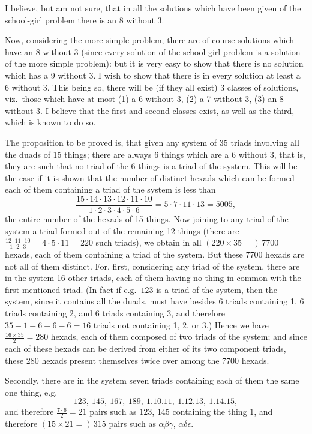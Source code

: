 \documentclass[11pt,a4paper]{article}
\theoremstyle{plain}
\begin{document}
I believe, but am not sure, that in all the solutions which have been given of the school-girl problem there is an 8 without 3.

Now, considering the more simple problem, there are of course solutions which have an 8 without 3 (since every solution of the school-girl problem is a solution of the more simple problem): but it is very easy to show that there is no solution which has a 9 without 3. I wish to show that there is in every solution at least a 6 without 3. This being so, there will be (if they all exist) 3 classes of solutions, viz.\ those which have at most (1) a 6 without 3, (2) a 7 without 3, (3) an 8 without 3. I believe that the first and second classes exist, as well as the third, which is known to do so.

The proposition to be proved is, that given any system of 35 triads involving all the duads of 15 things; there are always 6 things which are a 6 without 3, that is, they are such that no triad of the 6 things is a triad of the system. This will be the case if it is shown that the number of distinct hexads which can be formed each of them containing a triad of the system is less than
\[
\frac{15 \cdot 14 \cdot 13 \cdot 12 \cdot 11 \cdot 10}{1 \cdot 2 \cdot 3 \cdot 4 \cdot 5 \cdot 6} = 5 \cdot 7 \cdot 11 \cdot 13 = 5005,
\]
the entire number of the hexads of 15 things. Now joining to any triad of the system a triad formed out of the remaining 12 things (there are $\frac{12 \cdot 11 \cdot 10}{1 \cdot 2 \cdot 3} = 4 \cdot 5 \cdot 11 = 220$ such triads), we obtain in all $(220 \times 35 =)\, 7700$ hexads, each of them containing a triad of the system. But these 7700 hexads are not all of them distinct. For, first, considering any triad of the system, there are in the system 16 other triads, each of them having no thing in common with the first-mentioned triad. (In fact if e.g.\ $123$ is a triad of the system, then the system, since it contains all the duads, must have besides 6 triads containing 1, 6 triads containing 2, and 6 triads containing 3, and therefore $35 - 1 - 6 - 6 - 6 = 16$ triads not containing 1, 2, or 3.) Hence we have $\frac{16 \times 35}{2} = 280$ hexads, each of them composed of two triads of the system; and since each of these hexads can be derived from either of its two component triads, these 280 hexads present themselves twice over among the 7700 hexads.

Secondly, there are in the system seven triads containing each of them the same one thing, e.g.
\[
123,\ 145,\ 167,\ 189,\ 1.10.11,\ 1.12.13,\ 1.14.15,
\]
and therefore $\frac{7 \cdot 6}{2} = 21$ pairs such as $123$, $145$ containing the thing $1$, and therefore $(15 \times 21 =)\, 315$ pairs such as $\alpha\beta\gamma$, $\alpha\delta\epsilon$.
\end{document}
